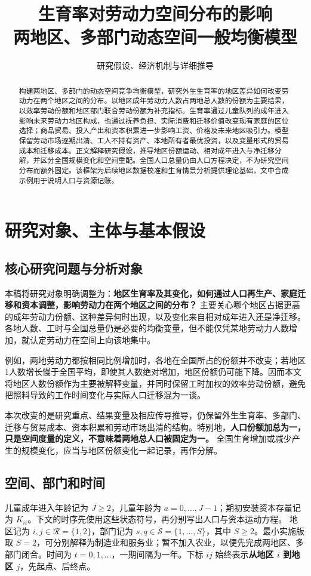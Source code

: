 \documentclass[UTF8,a4paper,zihao=-4,fontset=windows]{ctexart}
\title{生育率对劳动力空间分布的影响\\[0.4em]\large 两地区、多部门动态空间一般均衡模型}
\author{研究假设、经济机制与详细推导}
\date{}
\numberwithin{equation}{section}
\begin{document}
\maketitle
\begin{abstract}
构建两地区、多部门的动态空间竞争均衡模型，研究外生生育率的地区差异如何改变劳动力在两个地区之间的分布。以地区成年劳动力人数占两地总人数的份额为主要结果，以效率劳动份额和地区部门联合劳动份额为补充指标。生育率通过儿童队列的成年进入影响未来劳动力地区构成，也通过抚养负担、实际消费和迁移价值改变现有家庭的区位选择；商品贸易、投入产出和资本积累进一步影响工资、价格及未来地区吸引力。模型保留劳动市场逐期出清、工人不持有资产、本地所有者最优投资，以及变量形式的贸易成本和迁移成本。正文解释研究假设，推导地区份额运动、相对成年进入与净迁移分解，并区分全国规模变化和空间重配。全国人口总量仍由人口方程决定，不为研究空间分布而额外固定。该框架为后续地区数据校准和生育情景分析提供理论基础，文中合成示例用于说明人口与资源记账。
\end{abstract}
\newpage
\tableofcontents
\newpage

\section{研究对象、主体与基本假设}
\label{sec:setup}

\subsection{核心研究问题与分析对象}
本稿将研究对象明确调整为：\textbf{地区生育率及其变化，如何通过人口再生产、家庭迁移和资本调整，影响劳动力在两个地区之间的分布？} 主要关心哪个地区占据更高的成年劳动力份额、这种差异何时出现，以及变化来自相对成年进入还是净迁移。各地人数、工时与全国总量仍是必要的均衡变量，但不能仅凭某地劳动力人数增加，就认定劳动力在空间上向该地集中。

例如，两地劳动力都按相同比例增加时，各地在全国所占的份额并不改变；若地区1人数增长慢于全国平均，即使其人数绝对增加，地区份额仍可能下降。因而本文将地区人数份额作为主要被解释变量，并同时保留工时加权的效率劳动份额，避免把照料导致的工作时间变化与实际人口迁移混为一谈。

本次改变的是研究重点、结果变量及相应传导推导，仍保留外生生育率、多部门、迁移与贸易成本、资本积累和劳动市场出清的结构。特别地，\textbf{人口份额加总为一，只是空间度量的定义，不意味着两地总人口被固定为一。} 全国生育增加或减少产生的规模变化，应当与地区份额变化一起记录，再作分解。

\subsection{空间、部门和时间}
儿童成年进入年龄记为 $J\geq2$，儿童年龄为 $a=0,\ldots,J-1$；期初安装资本存量记为 $K_{it}$。下文的时序先使用这些状态符号，再分别写出人口与资本运动方程。
地区记为 $i,j\in\mathcal R=\{1,2\}$，部门记为 $s,q\in\mathcal S=\{1,\ldots,S\}$，其中 $S\geq2$。最小实施版取 $S=2$，可分别解释为制造业和服务业；暂不加入农业，以便先完成两地区、多部门闭合。时间为 $t=0,1,\ldots$，一期间隔为一年。下标 $ij$ 始终表示\textbf{从地区 $i$ 到地区 $j$}，先起点、后终点。
\end{document}
